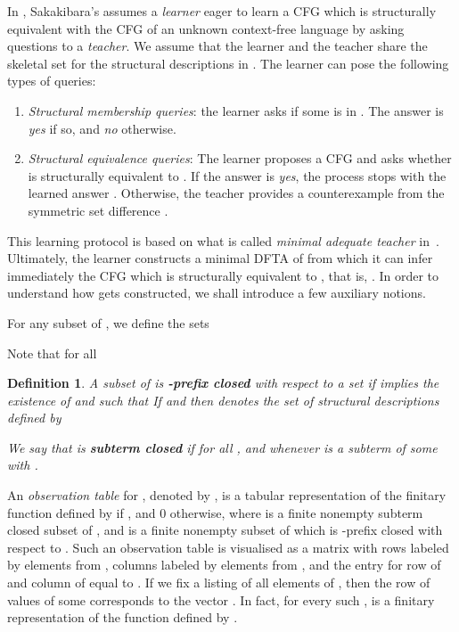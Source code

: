 \documentclass[preprint,12pt,english]{article}
\newtheorem{definition}{Definition}
\begin{document}
In \cite{Sak:1990}, Sakakibara's  assumes  a {\em learner} eager to learn a CFG which is structurally equivalent with the CFG  of an unknown context-free language  by asking  questions to a {\em teacher}. We assume that the learner and the teacher share the skeletal set  for the structural descriptions in . The learner can pose the following types of queries:
\begin{enumerate}
\item {\em Structural membership queries}: the learner asks if some  is in . The answer is {\em yes} if so, and {\em no} otherwise.
\item {\em Structural equivalence queries}: The learner proposes a CFG  and asks whether  is structurally equivalent to . 
If the answer is {\em yes}, the  process stops with the learned answer . Otherwise, the teacher provides a counterexample  from the symmetric set difference  .
\end{enumerate}
This learning protocol is based on what is called {\em minimal adequate teacher} in~\cite{Angluin:87}.
Ultimately, the learner constructs a minimal DFTA  of  from which it can infer immediately the CFG   which is structurally equivalent to , that is, .  In order to understand how  gets constructed, we shall introduce a few auxiliary notions. 

For any subset  of , we define the sets 

Note that  for all  
\begin{definition}
A subset  of  is {\bf -prefix closed} with respect to a set  if  implies the existence of  and  such that  If  and  then  denotes the set of structural descriptions defined by


We say that  is {\bf subterm closed} if  for all , and  whenever  is a subterm of some  with .
\end{definition}

An {\em observation table} for , denoted by , is a tabular representation of the finitary function 
defined by  if , and 0 otherwise,
where  is a finite nonempty subterm closed subset  of , and  is a finite nonempty subset of  which is -prefix closed with respect to .
Such an observation table is visualised as a matrix with rows labeled by elements from , columns labeled by elements from , and the entry for row of  and column of  equal to . If we fix a listing  of all elements of , then the row of values of some  corresponds to the vector . In fact, for every such ,  is a finitary representation of the function  defined by . 
\end{document}
